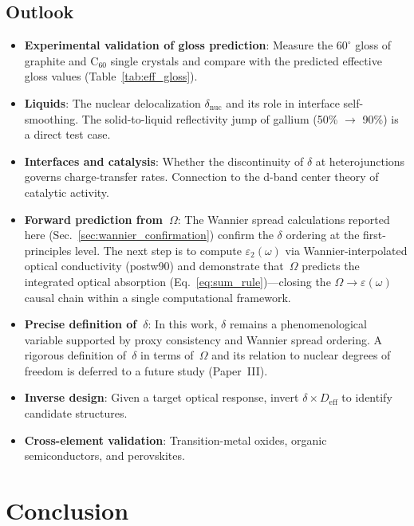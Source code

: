 \documentclass[twocolumn,showpacs,preprintnumbers,amsmath,amssymb,prb]{revtex4-2}
\begin{document}
\subsection{Outlook}

\begin{itemize}
  \item \textbf{Experimental validation of gloss prediction}: Measure
    the $60^\circ$ gloss of graphite and C$_{60}$ single crystals
    and compare with the predicted effective gloss values
    (Table~\ref{tab:eff_gloss}).
  \item \textbf{Liquids}: The nuclear delocalization
    $\delta_\mathrm{nuc}$ and its role in interface self-smoothing.
    The solid-to-liquid reflectivity jump of gallium (50\% $\to$ 90\%)
    is a direct test case.
  \item \textbf{Interfaces and catalysis}: Whether the discontinuity
    of $\delta$ at heterojunctions governs charge-transfer rates.
    Connection to the d-band center theory of catalytic activity.
  \item \textbf{Forward prediction from~$\Omega$}: The Wannier spread
    calculations reported here (Sec.~\ref{sec:wannier_confirmation})
    confirm the $\delta$ ordering at the first-principles level.
    The next step is to compute $\varepsilon_2(\omega)$ via
    Wannier-interpolated optical conductivity (postw90) and demonstrate
    that~$\Omega$ predicts the integrated optical absorption
    (Eq.~\ref{eq:sum_rule})---closing the
    $\Omega \to \varepsilon(\omega)$ causal chain within a single
    computational framework.
  \item \textbf{Precise definition of~$\delta$}: In this work,
    $\delta$ remains a phenomenological variable supported by proxy
    consistency and Wannier spread ordering. A rigorous definition
    of~$\delta$ in terms of~$\Omega$ and its relation to nuclear
    degrees of freedom is deferred to a future study (Paper~III).
  \item \textbf{Inverse design}: Given a target optical response,
    invert $\delta \times D_\mathrm{eff}$ to identify candidate
    structures.
  \item \textbf{Cross-element validation}: Transition-metal oxides,
    organic semiconductors, and perovskites.
\end{itemize}

\section{Conclusion}
\label{sec:conclusion}
\end{document}
